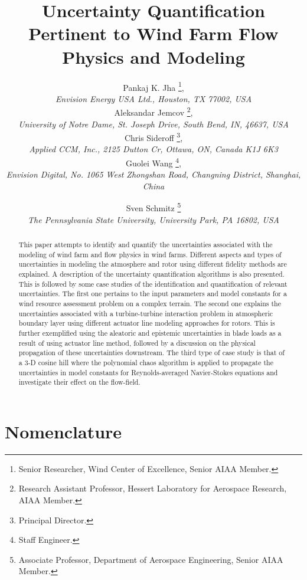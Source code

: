 \documentclass[]{aiaa-tc}%
\title{Uncertainty Quantification Pertinent to Wind Farm Flow Physics and Modeling}
\author{
    Pankaj K. Jha%
    \thanks{Senior Researcher, Wind Center of Excellence, Senior AIAA Member.},\\
   {\normalsize\itshape
   Envision Energy USA Ltd., Houston, TX 77002, USA}\\
    Aleksandar Jemcov%
    \thanks{Research Assistant Professor, Hessert Laboratory for Aerospace Research, AIAA Member.},\\
   {\normalsize\itshape
   University of Notre Dame, St. Joseph Drive, South Bend, IN, 46637, USA}\\
    Chris Sideroff%
    \thanks{Principal Director.},\\
   {\normalsize\itshape
   Applied CCM, Inc., 2125 Dutton Cr, Ottawa, ON, Canada K1J 6K3}\\
 Guolei Wang%
   \thanks{Staff Engineer.},\\
  {\normalsize\itshape
   Envision Digital, No. 1065 West Zhongshan Road, Changning District, Shanghai, China}\\
  \and
  Sven Schmitz %
   \thanks{Associate Professor, Department of Aerospace Engineering, Senior AIAA Member.}\\
  {\normalsize\itshape
  The Pennsylvania State University, University Park, PA 16802, USA}
 }
\begin{document}
\maketitle

\begin{abstract}
This paper attempts to identify and quantify the uncertainties associated with the modeling of wind farm and flow physics in wind farms. Different aspects and types of uncertainties in modeling the atmosphere and rotor using different fidelity methods are explained. A description of the uncertainty quantification algorithms is also presented. This is followed by some case studies of the identification and quantification of relevant uncertainties. The first one pertains to the input parameters and model constants for a wind resource assessment problem on a complex terrain. The second one explains the uncertainties associated with a turbine-turbine interaction problem in atmospheric boundary layer using different actuator line modeling approaches for rotors. This is further exemplified using the aleatoric and epistemic uncertainties in blade loads as a result of using actuator line method, followed by a discussion on the physical propagation of these uncertainties downstream. The third type of case study is that of a 3-D cosine hill where the polynomial chaos algorithm is applied to propagate the uncertainties in model constants for Reynolds-averaged Navier-Stokes equations and investigate their effect on the flow-field.    
\end{abstract}

\section*{Nomenclature}
\end{document}
